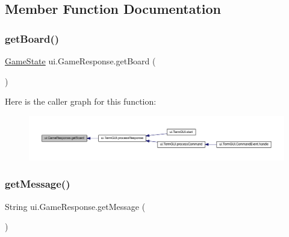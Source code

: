 \subsection{Member Function Documentation}
\mbox{\label{classui_1_1_game_response_a2d410f9ba57b395ba0ef9e31df75044b}} 
\subsubsection{\texorpdfstring{get\+Board()}{getBoard()}}
{\footnotesize\ttfamily \mbox{\hyperlink{classgame_1_1game_state_1_1_game_state}{Game\+State}} ui.\+Game\+Response.\+get\+Board (\begin{DoxyParamCaption}{ }\end{DoxyParamCaption})\hspace{0.3cm}{\ttfamily [inline]}}

Here is the caller graph for this function\+:
\nopagebreak
\begin{figure}[H]
\begin{center}
\leavevmode
\includegraphics[width=350pt]{classui_1_1_game_response_a2d410f9ba57b395ba0ef9e31df75044b_icgraph}
\end{center}
\end{figure}
\mbox{\label{classui_1_1_game_response_aeb684a43f6de864778d44a8efea1ac99}} 
\subsubsection{\texorpdfstring{get\+Message()}{getMessage()}}
{\footnotesize\ttfamily String ui.\+Game\+Response.\+get\+Message (\begin{DoxyParamCaption}{ }\end{DoxyParamCaption})\hspace{0.3cm}{\ttfamily [inline]}}

